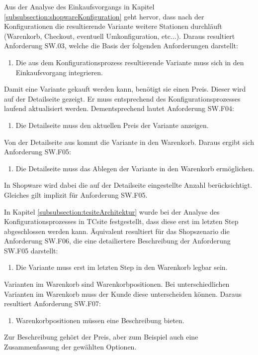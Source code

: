 \documentclass[12pt,a4paper,bibliography=totocnumbered,listof=totoc]{scrartcl}
\begin{document}
Aus der Analyse des Einkaufsvorgangs in Kapitel \ref{subsubsection:shopwareKonfiguration} geht hervor, dass nach der Konfigurationen die resultierende Variante weitere Stationen durchläuft (Warenkorb, Checkout, eventuell Umkonfiguration, etc...). Daraus resultiert Anforderung SW.03, welche die Basis der folgenden Anforderungen darstellt:
\begin{enumerate}[SW.F03:]\bfseries
\item Die aus dem Konfigurationsprozess resultierende Variante muss sich in den Einkaufsvorgang integrieren.
\end{enumerate}
Damit eine Variante gekauft werden kann, benötigt sie einen Preis. Dieser wird auf der Detailseite gezeigt. Er muss entsprechend des Konfigurationsprozesses laufend aktualisiert werden. Dementsprechend lautet Anforderung SW.F04:
\begin{enumerate}[SW.F04:]\bfseries
\item Die Detailseite muss den aktuellen Preis der Variante anzeigen.
\end{enumerate}
Von der Detailseite aus kommt die Variante in den Warenkorb. Daraus ergibt sich Anforderung SW.F05:
\begin{enumerate}[SW.F05:]\bfseries
\item Die Detailseite muss das Ablegen der Variante in den Warenkorb ermöglichen.
\end{enumerate}
In Shopware wird dabei die auf der Detailseite eingestellte Anzahl berücksichtigt. Gleiches gilt implizit für Anforderung SW.F05.

In Kapitel \ref{subsubsection:tcsiteArchitektur} wurde bei der Analyse des Konfigurationsprozesses in TCsite festgestellt, dass diese erst im letzten Step abgeschlossen werden kann. Äquivalent resultiert für das Shopszenario die Anforderung SW.F06, die eine detailiertere Beschreibung der Anforderung SW.F05 darstellt:
\begin{enumerate}[SW.F06:]\bfseries
\item Die Variante muss erst im letzten Step in den Warenkorb legbar sein.
\end{enumerate}
Varianten im Warenkorb sind Warenkorbpositionen. Bei unterschiedlichen Varianten im Warenkorb muss der Kunde diese unterscheiden können. Daraus resultiert Anforderung SW.F07:
\begin{enumerate}[SW.F07:]\bfseries
\item Warenkorbpositionen müssen eine Beschreibung bieten.
\end{enumerate}
Zur Beschreibung gehört der Preis, aber zum Beispiel auch eine Zusammenfassung der gewählten Optionen.
\end{document}

